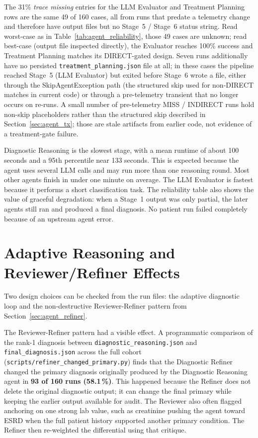 The 31\% \emph{trace missing} entries for the LLM Evaluator and
Treatment Planning rows are the same 49 of 160 cases, all from runs
that predate a telemetry change and therefore have output files but
no Stage~5 / Stage~6 status string. Read worst-case as in
Table~\ref{tab:agent_reliability}, those 49 cases are unknown; read
best-case (output file inspected directly), the Evaluator reaches
100\% success and Treatment Planning matches its DIRECT-gated design.
Seven runs additionally have no persisted \texttt{treatment\_planning.json}
file at all; in these cases the pipeline reached Stage~5 (LLM
Evaluator) but exited before Stage~6 wrote a file, either through the
SkipAgentException path (the structured skip used for non-DIRECT
matches in current code) or through a pre-telemetry transient that no
longer occurs on re-runs. A small number of pre-telemetry MISS /
INDIRECT runs hold non-skip placeholders rather than the structured
skip described in Section~\ref{sec:agent_tx}; those are stale
artifacts from earlier code, not evidence of a treatment-gate
failure.

Diagnostic Reasoning is the slowest stage, with a mean runtime of about
100 seconds and a 95th percentile near 133 seconds. This is expected because
the agent uses several LLM calls and may run more than one reasoning round.
Most other agents finish in under one minute on average. The LLM Evaluator is
fastest because it performs a short classification task. The reliability table
also shows the value of graceful degradation: when a Stage~1 output was only
partial, the later agents still ran and produced a final diagnosis. No patient
run failed completely because of an upstream agent error.

\section{Adaptive Reasoning and Reviewer/Refiner Effects}
\label{sec:results_adaptive}

Two design choices can be checked from the run files: the adaptive diagnostic
loop and the non-destructive Reviewer-Refiner pattern from
Section~\ref{sec:agent_refiner}.

The Reviewer-Refiner pattern had a visible effect. A programmatic
comparison of the rank-1 diagnosis between
\texttt{diagnostic\_\allowbreak reasoning.json} and
\texttt{final\_\allowbreak diagnosis.json} across the full cohort
(\texttt{scripts/refiner\_changed\_primary.py}) finds that the
Diagnostic Refiner changed the primary diagnosis originally produced
by the Diagnostic Reasoning agent in \textbf{93 of 160 runs (58.1\,\%)}.
This happened because the Refiner does not
delete the original diagnostic output; it can change the final primary while
keeping the earlier output available for audit. The Reviewer also often flagged
anchoring on one strong lab value, such as creatinine pushing the agent toward
ESRD when the full patient history supported another primary condition. The
Refiner then re-weighted the differential using that critique.

